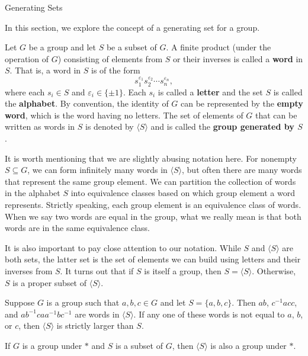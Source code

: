 \begin{section}{Generating Sets}


In this section, we explore the concept of a generating set for a group.

\begin{definition}
Let $G$ be a group and let $S$ be a subset of $G$. A finite product (under the operation of $G$) consisting of elements from $S$ or their inverses is called a \textbf{word} in $S$. That is, a word in $S$ is of the form
\[
s_{1}^{\varepsilon_1}s_{2}^{\varepsilon_2}\cdots s_{n}^{\varepsilon_n},
\]
where each $s_{i}\in S$ and $\varepsilon_i\in\{\pm 1\}$. Each $s_{i}$ is called a \textbf{letter} and the set $S$ is called the \textbf{alphabet}. By convention, the identity of $G$ can be represented by the \textbf{empty word}, which is the word having no letters. The set of elements of $G$ that can be written as words in $S$ is denoted by $\langle S\rangle$ and is called the \textbf{group generated by $S$}.
\end{definition}

It is worth mentioning that we are slightly abusing notation here. For nonempty $S\subseteq G$, we can form infinitely many words in $\langle S\rangle$, but often there are many words that represent the same group element. We can partition the collection of words in the alphabet $S$ into equivalence classes based on which group element a word represents. Strictly speaking, each group element is an equivalence class of words. When we say two words are equal in the group, what we really mean is that both words are in the same equivalence class.

It is also important to pay close attention to our notation. While $S$ and $\langle S\rangle$ are both sets, the latter set is the set of elements we can build using letters and their inverses from $S$. It turns out that if $S$ is itself a group, then $S=\langle S\rangle$. Otherwise, $S$ is a proper subset of $\langle S\rangle$. 

\begin{example}
Suppose $G$ is a group such that $a,b,c\in G$ and let $S=\{a,b,c\}$. Then $ab$, $c^{-1}acc$, and $ab^{-1}caa^{-1}bc^{-1}$ are words in $\langle S\rangle$. If any one of these words is not equal to $a$, $b$, or $c$, then $\langle S\rangle$ is strictly larger than $S$.
\end{example}

\begin{theorem}\label{thm:subgroup_generated_by_S}
If $G$ is a group under $*$ and $S$ is a subset of $G$, then $\langle S\rangle$ is also a group under $*$.
\end{theorem}


\end{section}
